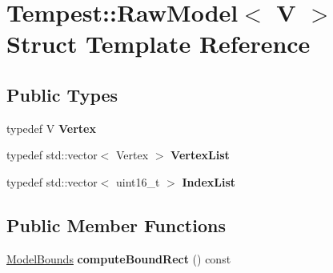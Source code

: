 \hypertarget{struct_tempest_1_1_raw_model}{\section{Tempest\+:\+:Raw\+Model$<$ V $>$ Struct Template Reference}
\label{struct_tempest_1_1_raw_model}
}
\subsection*{Public Types}
\begin{DoxyCompactItemize}
\item 
\hypertarget{struct_tempest_1_1_raw_model_a8723fca6b296fd8d5dd134b6d4e63904}{typedef V {\bfseries Vertex}}\label{struct_tempest_1_1_raw_model_a8723fca6b296fd8d5dd134b6d4e63904}

\item 
\hypertarget{struct_tempest_1_1_raw_model_a5099dddfa1a1f751d61158bc3c6f7714}{typedef std\+::vector$<$ Vertex $>$ {\bfseries Vertex\+List}}\label{struct_tempest_1_1_raw_model_a5099dddfa1a1f751d61158bc3c6f7714}

\item 
\hypertarget{struct_tempest_1_1_raw_model_a86202cf14076674f1b43e84a3af9d0e0}{typedef std\+::vector$<$ uint16\+\_\+t $>$ {\bfseries Index\+List}}\label{struct_tempest_1_1_raw_model_a86202cf14076674f1b43e84a3af9d0e0}

\end{DoxyCompactItemize}
\subsection*{Public Member Functions}
\begin{DoxyCompactItemize}
\item 
\hypertarget{struct_tempest_1_1_raw_model_a0c73ebc0c546d850fab613af7f0b3a06}{\hyperlink{struct_tempest_1_1_model_bounds}{Model\+Bounds} {\bfseries compute\+Bound\+Rect} () const }\label{struct_tempest_1_1_raw_model_a0c73ebc0c546d850fab613af7f0b3a06}

\end{DoxyCompactItemize}
